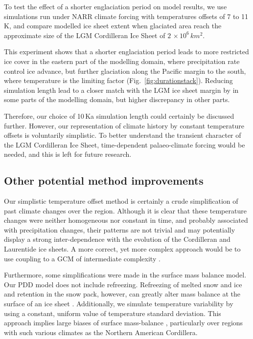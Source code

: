 To test the effect of a shorter englaciation period on model results, we use simulations run under NARR climate forcing with temperatures offsets of 7 to 11\,K, and compare modelled ice sheet extent when glaciated area reach the approximate size of the LGM Cordilleran Ice Sheet of $2\,\times10^6\,\unit{km^2}$.

This experiment shows that a shorter englaciation period leads to more restricted ice cover in the eastern part of the modelling domain, where precipitation rate control ice advance, but further glaciation along the Pacific margin to the south, where temperature is the limiting factor (Fig.~\ref{fig:durationstack}). Reducing simulation length lead to a closer match with the LGM ice sheet margin by \citet{dyke-2004} in some parts of the modelling domain, but higher discrepancy in other parts.

Therefore, our choice of 10\,Ka simulation length could certainly be discussed further. However, our representation of climate history by constant temperature offsets is voluntarily simplistic. To better understand the transient character of the LGM Cordilleran Ice Sheet, time-dependent palaeo-climate forcing would be needed, and this is left for future research.

\subsection{Other potential method improvements}

Our simplistic temperature offset method is certainly a crude simplification of past climate changes over the region. Although it is clear that these temperature changes were neither homogeneous nor constant in time, and probably associated with precipitation changes, their patterns are not trivial and may potentially display a strong inter-dependence with the evolution of the Cordilleran and Laurentide ice sheets. A more correct, yet more complex approach would be to use coupling to a GCM of intermediate complexity \citep{yoshimori-etal-2001,calov-etal-2002,abeouchi-etal-2007,charbit-etal-2013}.

Furthermore, some simplifications were made in the surface mass balance model. Our PDD model does not include refreezing. Refreezing of melted snow and ice and retention in the snow pack, however, can greatly alter mass balance at the surface of an ice sheet \citep{janssens-huybrechts-2000}. Additionally, we simulate temperature variability by using a constant, uniform value of temperature standard deviation. This approach implies large biases of surface mass-balance \citep{charbit-etal-2013,rau-rogozhina-2013,seguinot-inpress}, particularly over regions with such various climates as the Northern American Cordillera.

